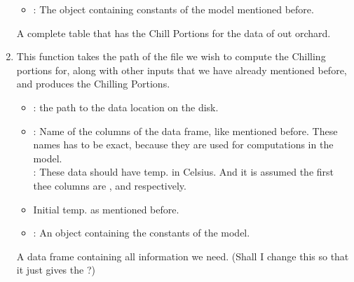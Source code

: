 \begin{enumerate}
\begin{itemize}
\item {}: The object containing constants of the model
mentioned before.
 \end{itemize}
 
 A complete table that has the Chill Portions for the 
data of out orchard.

\item {}

This function takes the path of the file we wish 
to compute the Chilling portions for, along with 
other inputs that we have already mentioned 
before, and produces the Chilling Portions.

\begin{itemize}
\item {}: the path to the data location on the disk.
\item {}: Name of the columns 
of the data frame, like mentioned before. These 
names has to be exact, because they are used for
computations in the model.\\

{}: These data should have temp. in Celsius. And it is assumed the first thee columns are ,  and  respectively.\\

\item {} Initial temp. as mentioned before.

\item {}: An object containing the constants of the model.
\end{itemize}

 A data frame containing all information we need. (Shall I change this so that it just gives the ?)

\end{enumerate}

